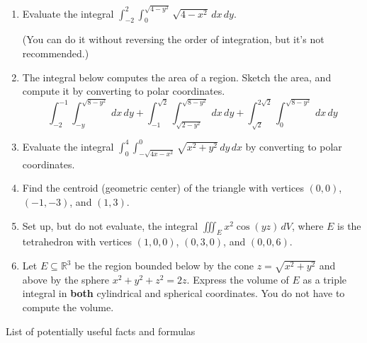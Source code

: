 \documentclass[12pt]{article}
\newcommand{\points}[1]{\marginpar{\hspace{24pt}[#1]}}
\newcommand{\di}{\displaystyle}
\newcommand{\R}{\mathbb{R}}
\begin{document}
\begin{enumerate}
\item Evaluate the integral $\di \int_{-2}^2\int_0^{\sqrt{4-y^2}}\sqrt{4-x^2}\,dx\,dy$. \points{6}

(You can do it without reversing the order of integration, but it's not recommended.)


\vspace{3.5in}

\item The integral below computes the area of a region. Sketch the area, and compute it by converting to polar coordinates. \points{6}
\[
\int_{-2}^{-1}\int_{-y}^{\sqrt{8-y^2}}\,dx\,dy+\int_{-1}^{\sqrt{2}}\int_{\sqrt{2-y^2}}^{\sqrt{8-y^2}}\,dx\,dy + \int_{\sqrt{2}}^{2\sqrt{2}}\int_0^{\sqrt{8-y^2}}\,dx\,dy
\]
\newpage
\item Evaluate the integral $\di \int_0^4\int_{-\sqrt{4x-x^2}}^0\sqrt{x^2+y^2}\,dy\,dx$ by converting to polar coordinates. \points{6}

\vspace{3in}

\item Find the centroid (geometric center) of the triangle with vertices $(0,0)$, $(-1,-3)$, and $(1,3)$. \points{8}

\newpage

\item Set up, but do not evaluate, the integral $\di \iiint_E x^2\cos(yz)\,dV$, where $E$ is the tetrahedron with vertices $(1,0,0)$, $(0,3,0)$, and $(0,0,6)$. \points{6}

\vspace{3.5in}

\item Let $E\subseteq \R^3$ be the region bounded below by the cone $z=\sqrt{x^2+y^2}$ and above by the sphere $x^2+y^2+z^2=2z$. Express the volume of $E$ as a triple integral in {\bf both} cylindrical and spherical coordinates. You do not have to compute the volume. \points{6}
\end{enumerate}
\newpage
\begin{center}
List of potentially useful facts and formulas
\end{center}
\end{document}
